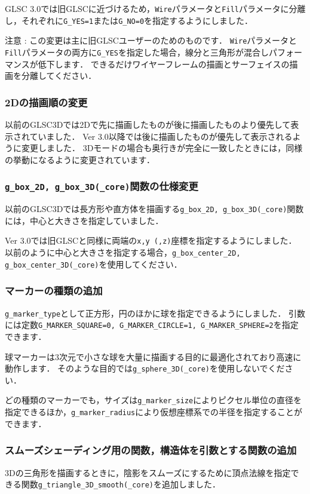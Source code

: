 \documentclass[platex,a4paper,12pt]{jsarticle}%
\begin{document}
GLSC 3.0では旧GLSCに近づけるため，\verb|Wire|パラメータと\verb|Fill|パラメータに分離し，それぞれに\verb|G_YES=1|または\verb|G_NO=0|を指定するようにしました．

注意 : この変更は主に旧GLSCユーザーのためのものです．
\verb|Wire|パラメータと\verb|Fill|パラメータの両方に\verb|G_YES|を指定した場合，線分と三角形が混合しパフォーマンスが低下します．
できるだけワイヤーフレームの描画とサーフェイスの描画を分離してください．

\newpage
\subsubsection{2Dの描画順の変更}
以前のGLSC3Dでは2Dで先に描画したものが後に描画したものより優先して表示されていました．
Ver 3.0以降では後に描画したものが優先して表示されるように変更しました．
3Dモードの場合も奥行きが完全に一致したときには，同様の挙動になるように変更されています．

\subsubsection{\texttt{g\_box\_2D, g\_box\_3D(\_core)}関数の仕様変更}
以前のGLSC3Dでは長方形や直方体を描画する\verb|g_box_2D, g_box_3D(_core)|関数には，中心と大きさを指定していました．

Ver 3.0では旧GLSCと同様に両端の\verb|x,y (,z)|座標を指定するようにしました．
以前のように中心と大きさを指定する場合，\verb|g_box_center_2D, g_box_center_3D(_core)|を使用してください．

\subsubsection{マーカーの種類の追加}
\verb|g_marker_type|として正方形，円のほかに球を指定できるようにしました．
引数には定数\verb|G_MARKER_SQUARE=0, G_MARKER_CIRCLE=1, G_MARKER_SPHERE=2|を指定できます．

球マーカーは3次元で小さな球を大量に描画する目的に最適化されており高速に動作します．
そのような目的では\verb|g_sphere_3D(_core)|を使用しないでください．

どの種類のマーカーでも，サイズは\verb|g_marker_size|によりピクセル単位の直径を指定できるほか，\verb|g_marker_radius|により仮想座標系での半径を指定することができます．

\subsubsection{スムーズシェーディング用の関数，構造体を引数とする関数の追加}
3Dの三角形を描画するときに，陰影をスムーズにするために頂点法線を指定できる関数\verb|g_triangle_3D_smooth(_core)|を追加しました．\\
\end{document}
